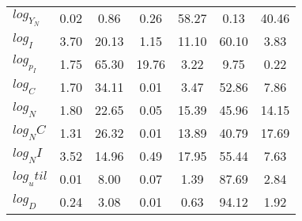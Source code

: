 \begin{center}
\begin{longtable}{lcccccc}
$log_Y_N   $	 & 	        0.02	 & 	        0.86	 & 	        0.26	 & 	       58.27	 & 	        0.13	 & 	       40.46 \\ 
$log_I     $	 & 	        3.70	 & 	       20.13	 & 	        1.15	 & 	       11.10	 & 	       60.10	 & 	        3.83 \\ 
$log_p_I   $	 & 	        1.75	 & 	       65.30	 & 	       19.76	 & 	        3.22	 & 	        9.75	 & 	        0.22 \\ 
$log_C     $	 & 	        1.70	 & 	       34.11	 & 	        0.01	 & 	        3.47	 & 	       52.86	 & 	        7.86 \\ 
$log_N     $	 & 	        1.80	 & 	       22.65	 & 	        0.05	 & 	       15.39	 & 	       45.96	 & 	       14.15 \\ 
$log_NC    $	 & 	        1.31	 & 	       26.32	 & 	        0.01	 & 	       13.89	 & 	       40.79	 & 	       17.69 \\ 
$log_NI    $	 & 	        3.52	 & 	       14.96	 & 	        0.49	 & 	       17.95	 & 	       55.44	 & 	        7.63 \\ 
$log_util  $	 & 	        0.01	 & 	        8.00	 & 	        0.07	 & 	        1.39	 & 	       87.69	 & 	        2.84 \\ 
$log_D     $	 & 	        0.24	 & 	        3.08	 & 	        0.01	 & 	        0.63	 & 	       94.12	 & 	        1.92 \\ 
\end{longtable}
 \end{center}
